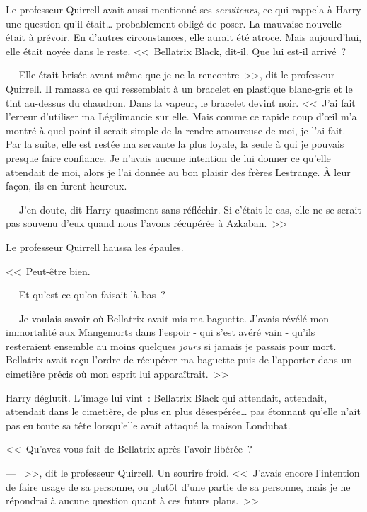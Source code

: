 Le professeur Quirrell avait aussi mentionné ses \emph{serviteurs}, ce qui rappela à Harry une question qu'il était… probablement obligé de poser. La mauvaise nouvelle était à prévoir. En d'autres circonstances, elle aurait été atroce. Mais aujourd'hui, elle était noyée dans le reste. <<~Bellatrix Black, dit-il. Que lui est-il arrivé~?

--- Elle était brisée avant même que je ne la rencontre~>>, dit le professeur Quirrell. Il ramassa ce qui ressemblait à un bracelet en plastique blanc-gris et le tint au-dessus du chaudron. Dans la vapeur, le bracelet devint noir. <<~J'ai fait l'erreur d'utiliser ma Légilimancie sur elle. Mais comme ce rapide coup d'œil m'a montré à quel point il serait simple de la rendre amoureuse de moi, je l'ai fait. Par la suite, elle est restée ma servante la plus loyale, la seule à qui je pouvais presque faire confiance. Je n'avais aucune intention de lui donner ce qu'elle attendait de moi, alors je l'ai donnée au bon plaisir des frères Lestrange. À leur façon, ils en furent heureux.

--- J'en doute, dit Harry quasiment sans réfléchir. Si c'était le cas, elle ne se serait pas souvenu d'eux quand nous l'avons récupérée à Azkaban.~>>

Le professeur Quirrell haussa les épaules.

<<~Peut-être bien.

--- Et qu'est-ce qu'on faisait là-bas~?

--- Je voulais savoir où Bellatrix avait mis ma baguette. J'avais révélé mon immortalité aux Mangemorts dans l'espoir - qui s'est avéré vain - qu'ils resteraient ensemble au moins quelques \emph{jours} si jamais je passais pour mort. Bellatrix avait reçu l'ordre de récupérer ma baguette puis de l'apporter dans un cimetière précis où mon esprit lui apparaîtrait.~>>

Harry déglutit. L'image lui vint~: Bellatrix Black qui attendait, attendait, attendait dans le cimetière, de plus en plus désespérée… pas étonnant qu'elle n'ait pas eu toute sa tête lorsqu'elle avait attaqué la maison Londubat.

<<~Qu'avez-vous fait de Bellatrix après l'avoir libérée~?

--- ~>>, dit le professeur Quirrell. Un sourire froid. <<~J'avais encore l'intention de faire usage de sa personne, ou plutôt d'une partie de sa personne, mais je ne répondrai à aucune question quant à ces futurs plans.~>>

